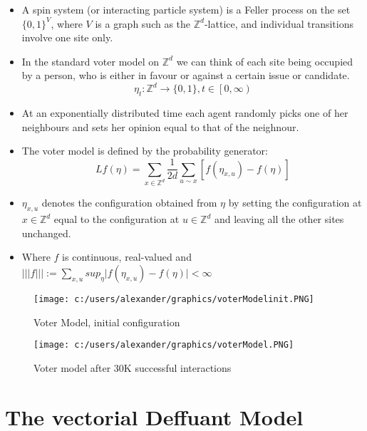 \documentclass[
paper=128mm:96mm, %
fontsize=11pt, %
pagesize, %
parskip=half-, %
]{scrartcl} %
\theoremstyle{mythmstyle} %
\begin{document}
\begin{itemize}
\item A spin system (or interacting particle system) is a Feller process on the set $\{0,1\}^V$, where $V$ is a graph such as the $\mathbb{Z}^d$-lattice, and individual transitions involve one site only. 
\item In the standard voter model on $\mathbb{Z}^d$ we can think of each site being occupied by a person, who is either in favour or against a certain issue or candidate.
\begin{equation}
\eta_t: \mathbb{Z}^d \longrightarrow \{0,1\}, t \in \left[ 0, \infty \right) 
\end{equation}
\item At an exponentially distributed time each agent randomly picks one of her neighbours and sets her opinion equal to that of the neighnour.
\item The voter model is defined by the probability generator:
\begin{equation}
Lf(\eta) = \sum_{x \in \mathbb{Z}^d} \frac{1}{2d} \sum_{u \sim x}\left[ f(\eta_{x,u})-f(\eta)\right] 
\end{equation}
\item $\eta_{x,u}$ denotes the configuration obtained from $\eta$ by setting the configuration at $x \in \mathbb{Z}^d$ equal to the configuration at $u \in \mathbb{Z}^d$ and leaving all the other sites unchanged.
\item Where $f$ is continuous, real-valued and $\vert\vert\vert f \vert\vert\vert := \sum_{x,u}sup_{\eta}\vert f(\eta_{x,u})-f(\eta)\vert < \infty$
\end{itemize}
\clearpage
\begin{figure}[!tbp]
  \centering
  \begin{minipage}[b]{0.4\textwidth}
    \texttt{[image: c:/users/alexander/graphics/voterModelinit.PNG]}
    \caption{Voter Model, initial configuration}
  \end{minipage}
  \hfill
  \begin{minipage}[b]{0.4\textwidth}
    \texttt{[image: c:/users/alexander/graphics/voterModel.PNG]}
    \caption{Voter model after 30K successful interactions}
  \end{minipage}
\end{figure}
\clearpage

\clearpage

\section{The vectorial Deffuant Model}
\end{document}

